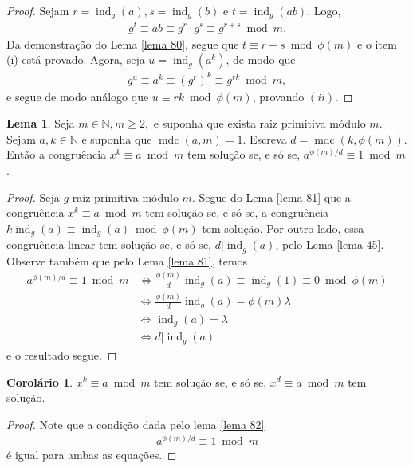 \documentclass[a4paper,11pt,twoside, leqno]{article}
\DeclareMathOperator{\mdc}{mdc}
\DeclareMathOperator{\ind}{ind}
\theoremstyle{definition}
\newtheorem{corollary}{Corolário}[theorem]
\newtheorem{lemma}[theorem]{Lema}
\begin{document}
\begin{proof}
	Sejam $r = \ind_g(a), s = \ind_g(b)$ e $t = \ind_g(ab)$. Logo,
	\begin{align*}
	g^t\equiv ab\equiv g^r\cdot g^s\equiv g^{r+s}\bmod m.
	\end{align*}
	Da demonstração do Lema \eqref{lema 80}, segue que $t\equiv r+s\bmod\phi(m)$ e o item (i) está provado. Agora, seja $u = \ind_g(a^k)$, de modo que
	\begin{align*}
	g^u\equiv a^k\equiv (g^r)^k\equiv g^{rk}\bmod m,
	\end{align*}
	e segue de modo análogo que $u\equiv rk\bmod\phi(m)$, provando $(ii)$.
\end{proof}
\begin{lemma}
	\label{lema 82}
	Seja $m\in\mathbb{N}, m\geq 2,$ e suponha que exista raiz primitiva módulo $m$. Sejam $a,k\in\mathbb{N}$ e suponha que $\mdc(a,m) = 1$. Escreva $d = \mdc(k,\phi(m))$. Então a congruência $x^k\equiv a\bmod m$ tem solução se, e só se, $a^{\phi(m)/d}\equiv 1\bmod m$.
\end{lemma}
\begin{proof}
	Seja $g$ raiz primitiva módulo $m$. Segue do Lema \eqref{lema 81} que a congruência $x^k\equiv a\bmod m$ tem solução se, e só se, a congruência $k\ind_g(a)\equiv \ind_g(a)\bmod\phi(m)$ tem solução. Por outro lado, essa congruência linear tem solução se, e só se, $d|\ind_g(a)$, pelo Lema \eqref{lema 45}. Observe também que pelo Lema \eqref{lema 81}, temos
	\begin{align*}
	a^{\phi(m)/d}\equiv 1\bmod m &\Longleftrightarrow \frac{\phi(m)}{d}\ind_g(a)\equiv\ind_g(1)\equiv 0\bmod\phi(m) \\
	&\Longleftrightarrow \frac{\phi(m)}{d}\ind_g(a) = \phi(m)\lambda \\
	&\Longleftrightarrow \ind_g(a) = \lambda \\
	&\Longleftrightarrow d|\ind_g(a)
	\end{align*}
	e o resultado segue.
\end{proof}
\begin{corollary}
	$x^k\equiv a\bmod m$ tem solução se, e só se, $x^d\equiv a\bmod m$ tem solução.
\end{corollary}
\begin{proof}
	Note que a condição dada pelo lema \eqref{lema 82}
	\begin{align*}
	a^{\phi(m)/d}\equiv 1\bmod m
	\end{align*}
	é igual para ambas as equações.
\end{proof}
\end{document}
